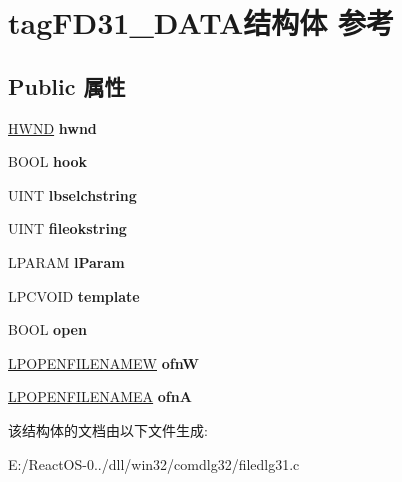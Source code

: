 \hypertarget{structtag_f_d31___d_a_t_a}{}\section{tag\+F\+D31\+\_\+\+D\+A\+T\+A结构体 参考}
\label{structtag_f_d31___d_a_t_a}
\subsection*{Public 属性}
\begin{DoxyCompactItemize}
\item 
\mbox{\label{structtag_f_d31___d_a_t_a_a5436296dedb870326debf5de48dfe696}} 
\hyperlink{interfacevoid}{H\+W\+ND} {\bfseries hwnd}
\item 
\mbox{\label{structtag_f_d31___d_a_t_a_a920270a2176a250c0075febbada8eec4}} 
B\+O\+OL {\bfseries hook}
\item 
\mbox{\label{structtag_f_d31___d_a_t_a_a709a4291dad4c12663e83922299ca497}} 
U\+I\+NT {\bfseries lbselchstring}
\item 
\mbox{\label{structtag_f_d31___d_a_t_a_a8559358a87fc99b87d2200f48b2bec48}} 
U\+I\+NT {\bfseries fileokstring}
\item 
\mbox{\label{structtag_f_d31___d_a_t_a_a00a8fd731d94da22d04e469c50e40215}} 
L\+P\+A\+R\+AM {\bfseries l\+Param}
\item 
\mbox{\label{structtag_f_d31___d_a_t_a_a09d498705bd773bf308cac8b09b871e0}} 
L\+P\+C\+V\+O\+ID {\bfseries template}
\item 
\mbox{\label{structtag_f_d31___d_a_t_a_a42dd9a585cc53d588ca1acf7120e7743}} 
B\+O\+OL {\bfseries open}
\item 
\mbox{\label{structtag_f_d31___d_a_t_a_a955a40e5d2b35f93e3f8347daa0e51e1}} 
\hyperlink{structtag_o_f_n_w}{L\+P\+O\+P\+E\+N\+F\+I\+L\+E\+N\+A\+M\+EW} {\bfseries ofnW}
\item 
\mbox{\label{structtag_f_d31___d_a_t_a_af1f7a62b9764bfa9a37a16b59bcba68c}} 
\hyperlink{structtag_o_f_n_a}{L\+P\+O\+P\+E\+N\+F\+I\+L\+E\+N\+A\+M\+EA} {\bfseries ofnA}
\end{DoxyCompactItemize}


该结构体的文档由以下文件生成\+:\begin{DoxyCompactItemize}
\item 
E\+:/\+React\+O\+S-\/0../dll/win32/comdlg32/filedlg31.\+c\end{DoxyCompactItemize}
